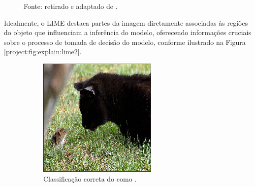 \begin{figure}[H]
    Fonte: retirado e adaptado de \cite{Ribeiro2016WhyClassifier}.
\end{figure}

Idealmente, o LIME destaca partes da imagem diretamente associadas às regiões do objeto que influenciam a inferência do modelo, oferecendo informações cruciais sobre o processo de tomada de decisão do modelo, conforme ilustrado na Figura \ref{project:fig:explain:lime2}.

\begin{figure}[H]
    \centering
    \caption{Exemplo de saída gerado pelo LIME em situação correta.}
    \label{project:fig:explain:lime2}
    \begin{subfigure}[t]{0.5\textwidth}
        \centering
        \includegraphics[width=1\linewidth]{recursos/imagens/project/gato.png}
        \caption{Classificação correta do  como .}
        \label{project:fig:explain:lime2.1}
    \end{subfigure}%
    ~
    \begin{subfigure}[t]{0.5\textwidth}
        \centering

\end{subfigure}
\end{figure}
